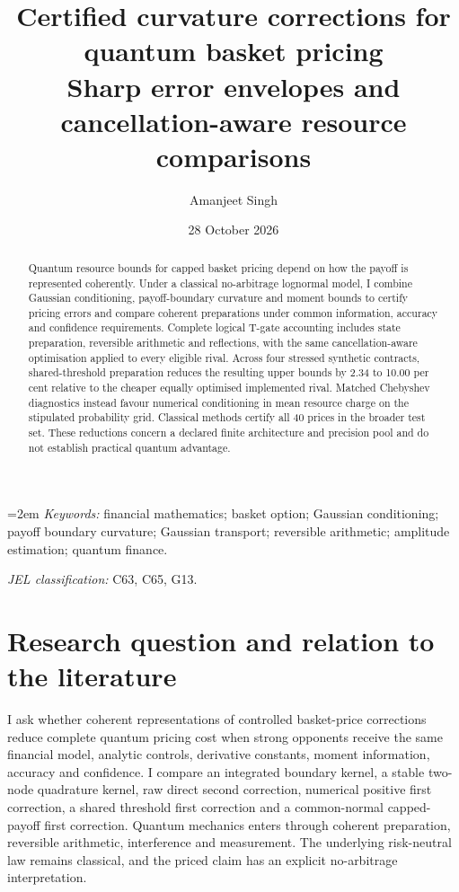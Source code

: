 \documentclass[11pt]{article}
\title{Certified curvature corrections for quantum basket pricing\\[3mm]
\large Sharp error envelopes and cancellation-aware resource comparisons}
\author{Amanjeet Singh}
\date{28 October 2026}
\begin{document}
\maketitle
\begin{abstract}
\noindent
Quantum resource bounds for capped basket pricing depend on how the payoff
is represented coherently. Under a classical no-arbitrage lognormal model,
I combine Gaussian conditioning, payoff-boundary curvature and moment bounds
to certify pricing errors and compare coherent preparations under common
information, accuracy and confidence requirements. Complete logical T-gate
accounting includes state preparation, reversible arithmetic and reflections,
with the same cancellation-aware optimisation applied to every eligible rival.
Across four stressed synthetic contracts, shared-threshold preparation reduces
the resulting upper bounds by 2.34 to 10.00 per cent relative to the cheaper
equally optimised implemented rival. Matched Chebyshev diagnostics instead
favour numerical conditioning in mean resource charge on the stipulated
probability grid. Classical methods certify all 40 prices in the broader
test set. These reductions concern a declared finite architecture and
precision pool and do not establish practical quantum advantage.
\end{abstract}

\smallskip
\noindent\begin{minipage}{\linewidth}
\small\emergencystretch=2em
\textit{Keywords:} financial mathematics; basket option; Gaussian conditioning;
payoff boundary curvature; Gaussian transport; reversible arithmetic;
amplitude estimation; quantum finance.\par
\smallskip
\textit{JEL classification:} C63, C65, G13.\par
\end{minipage}

\section{Research question and relation to the literature}
\label{sec:question}

I ask whether coherent representations of controlled basket-price
corrections reduce complete quantum pricing cost when strong opponents
receive the same financial model, analytic controls, derivative constants,
moment information, accuracy and confidence. I compare an integrated
boundary kernel, a stable two-node quadrature kernel, raw direct second
correction, numerical positive first correction, a shared threshold
first correction and a common-normal capped-payoff first correction. Quantum
mechanics enters through coherent preparation, reversible arithmetic,
interference and measurement. The underlying risk-neutral law remains
classical, and the priced claim has an explicit no-arbitrage interpretation.
\end{document}
